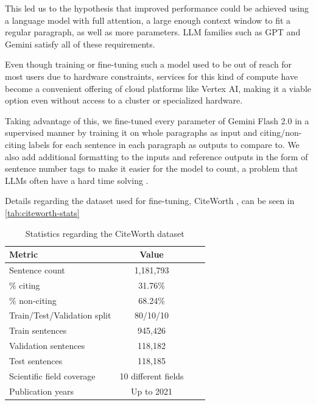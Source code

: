 \documentclass[12pt,a4paper]{report}
\begin{document}
This led us to the hypothesis that improved performance could be achieved using a language model with full attention, a large enough context window to fit a regular paragraph, as well as more parameters. LLM families such as GPT \cite{Achiam2023GPT4TR} and Gemini \cite{Reid2024Gemini1U} satisfy all of these requirements.

Even though training or fine-tuning such a model used to be out of reach for most users due to hardware constraints, services for this kind of compute have become a convenient offering of cloud platforms like Vertex AI, making it a viable option even without access to a cluster or specialized hardware.

Taking advantage of this, we fine-tuned every parameter of Gemini Flash 2.0 \cite{gemini-flash-2} in a supervised manner by training it on whole paragraphs as input and citing/non-citing labels for each sentence in each paragraph as outputs to compare to. We also add additional formatting to the inputs and reference outputs in the form of sentence number tags to make it easier for the model to count, a problem that LLMs often have a hard time solving \cite{Fu2024WhyDL}.

Details regarding the dataset used for fine-tuning, CiteWorth \cite{Wright2021CiteWorthCD}, can be seen in \autoref{tab:citeworth-stats}

\begin{table}[th]
\centering
\small
\setlength{\tabcolsep}{12pt}
\renewcommand{\arraystretch}{1.2}
\begin{tabular}{lccc}
\toprule
\textbf{Metric} & \textbf{Value} \\
\midrule
Sentence count &  1,181,793 \\
\% citing & 31.76\% \\
\% non-citing & 68.24\% \\
Train/Test/Validation split & 80/10/10 \\
Train sentences & 945,426 \\
Validation sentences &  118,182 \\
Test sentences & 118,185 \\
Scientific field coverage & 10 different fields \\
Publication years & Up to 2021 \\
\bottomrule
\end{tabular}
\caption{Statistics regarding the CiteWorth dataset \cite{Wright2021CiteWorthCD}}
\label{tab:citeworth-stats}
\end{table}
\end{document}
